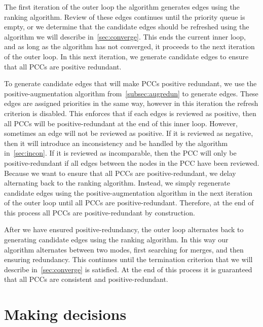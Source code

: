 The first iteration of the outer loop the algorithm generates edges using the ranking algorithm.
Review of these edges continues until the priority queue is empty, or we determine that the candidate edges
  should be refreshed using the algorithm we will describe in~\cref{sec:converge}.
This ends the current inner loop, and as long as the algorithm has not converged, it proceeds to the next
  iteration of the outer loop.
In this next iteration, we generate candidate edges to ensure that all PCCs are positive redundant.

To generate candidate edges that will make PCCs positive redundant, we use the positive-augmentation algorithm
  from~\cref{subsec:augredun} to generate edges.
These edges are assigned priorities in the same way, however in this iteration the refresh criterion is disabled.
This enforces that if each edges is reviewed as positive, then all PCCs will be positive-redundant at the end of
  this inner loop.
However, sometimes an edge will not be reviewed as positive.
If it is reviewed as negative, then it will introduce an inconsistency and be handled by the algorithm
  in~\cref{sec:incon}.
If it is reviewed as incomparable, then the PCC will only be positive-redundant if all edges between the nodes in
  the PCC have been reviewed.
Because we want to ensure that all PCCs are positive-redundant, we delay alternating back to the ranking
  algorithm.
Instead, we simply regenerate candidate edges using the positive-augmentation algorithm in the next iteration of
  the outer loop until all PCCs are positive-redundant.
Therefore, at the end of this process all PCCs are positive-redundant by construction.

After we have ensured positive-redundancy, the outer loop alternates back to generating candidate edges using the
  ranking algorithm.
In this way our algorithm alternates between two modes, first searching for merges, and then ensuring redundancy.
This continues until the termination criterion that we will describe in~\cref{sec:converge} is satisfied.
At the end of this process it is guaranteed that all PCCs are consistent and positive-redundant.


\section{Making decisions}\label{sec:decision}


